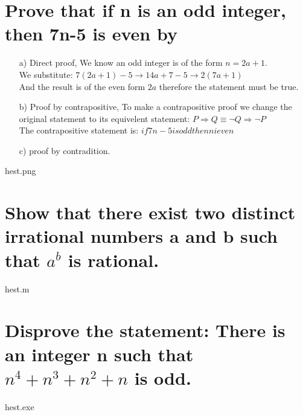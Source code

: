 \section{Prove that if n is an odd integer, then 7n-5 is even by}
\begin{itemize}
\item[a)] Direct proof,
We know an odd integer is of the form $n=2a+1$.\\
We substitute: $7(2a+1)-5\rightarrow14a+7-5\rightarrow2(7a+1)$\\
And the result is of the even form $2a$ therefore the statement must be true.
\item[b)] Proof by contrapositive,
To make a contrapositive proof we change the original statement to its equivelent statement: $P \Rightarrow Q \equiv \neg Q \Rightarrow \neg P$\\
The contrapositive statement is: $if 7n-5 is odd then n i even$\\

\item[c)] proof by contradition.
\end{itemize}
hest.png

\section{Show that there exist two distinct irrational numbers a and b such that $a^b$ is rational.}
hest.m

\section{Disprove the statement: There is an integer n such that $n^4+n^3+n^2+n$ is odd.}
hest.exe